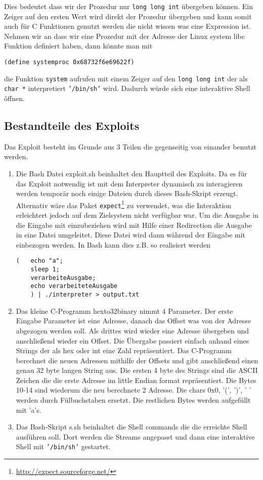 Dies bedeutet dass wir der Prozedur nur \texttt{long long int} übergeben können. 
Ein Zeiger auf den ersten Wert wird direkt der Prozedur übergeben und kann somit auch für C Funktionen genutzt werden die nicht  wissen was eine Expression ist. 
Nehmen wir an dass wir eine Prozedur mit der Adresse der Linux system libc Funktion definiert haben, dann könnte man mit 
\begin{lstlisting}
(define systemproc 0x68732f6e69622f)
\end{lstlisting}
die Funktion \texttt{system} aufrufen mit einem Zeiger auf den \texttt{long long int} der als \texttt{char *} interpretiert \texttt{'/bin/sh'} wird. Dadurch würde sich eine interaktive Shell öffnen.
\subsection{Bestandteile des Exploits}
Das Exploit besteht im Grunde aus 3 Teilen die gegenseitig von einander benutzt werden.
\begin{enumerate}
\item Die Bash Datei exploit.sh beinhaltet den Hauptteil des Exploits. Da es für das Exploit notwendig ist mit dem Interpreter dynamisch zu interagieren werden temporär noch einige Dateien durch dieses Bash-Skript erzeugt. 
Alternativ wäre das Paket \texttt{expect}\footnote{\url{http://expect.sourceforge.net/}} zu verwendet, was die Interaktion erleichtert jedoch auf dem Zielsystem nicht verfügbar war. 
Um die Ausgabe in die Eingabe mit einzubeziehen wird mit Hilfe einer Redirection die Ausgabe in eine Datei umgeleitet. Diese Datei wird dann während der Eingabe mit einbezogen werden. 
In Bash kann dies z.B. so realisiert werden 
\begin{lstlisting}
(	echo "a"; 
	sleep 1; 
	verarbeiteAusgabe; 
	echo verarbeiteteAusgabe
	) | ./interpreter > output.txt
\end{lstlisting}
\item Das kleine C-Programm hexto32binary nimmt 4 Parameter. Der erste Eingabe Parameter ist eine Adresse, danach das Offset was von der Adresse abgezogen werden soll. Als drittes wird wieder eine Adresse übergeben und anschließend wieder ein Offset.
Die Übergabe passiert einfach anhand eines Strings der als hex oder int eine Zahl repräsentiert. Das C-Programm berechnet die neuen Adressen mithilfe der Offsets und gibt anschließend einen genau 32 byte langen String aus.
 Die ersten 4 byte des Strings sind die ASCII Zeichen die die erste Adresse im little Endian format repräsentiert. 
Die Bytes 10-14 sind wiederum die neu berechnete 2 Adresse. Die chars 0x0, '(', ')', ' ' werden durch Fülbuchstaben ersetzt. Die restlichen Bytes werden aufgefüllt mit 'a's.
\item Das Bash-Skript s.sh beinhaltet die Shell commands die die erreichte Shell ausführen soll. Dort werden die Streams angepasst und dann eine interaktive Shell mit \texttt{'/bin/sh'} gestartet.
\end{enumerate}
